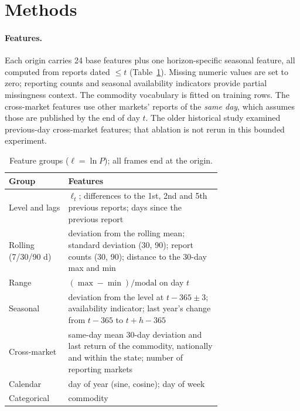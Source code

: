 \section{Methods}\label{sec:methods}

\paragraph{Features.}
Each origin carries 24 base features plus one horizon-specific seasonal feature, all computed from reports dated $\le t$ (Table~\ref{tab:features}).
Missing numeric values are set to zero; reporting counts and seasonal availability indicators provide partial missingness context. The commodity vocabulary is fitted on training rows.
The cross-market features use other markets' reports of the \emph{same day}, which assumes those are published by the end of day $t$.
The older historical study examined previous-day cross-market features; that ablation is not rerun in this bounded experiment.

\begin{table}[!t]\centering\small
\caption{Feature groups ($\ell=\ln P$); all frames end at the origin.}\label{tab:features}
\begin{tabular}{@{}lp{0.72\linewidth}@{}}\toprule
Group & Features\\\midrule
Level and lags & $\ell_t$; differences to the 1st, 2nd and 5th previous reports; days since the previous report\\
Rolling (7/30/90 d) & deviation from the rolling mean; standard deviation (30, 90); report counts (30, 90); distance to the 30-day max and min\\
Range & $(\max-\min)/\text{modal}$ on day $t$\\
Seasonal & deviation from the level at $t-365\pm3$; availability indicator; last year's change from $t-365$ to $t+h-365$\\
Cross-market & same-day mean 30-day deviation and last return of the commodity, nationally and within the state; number of reporting markets\\
Calendar & day of year (sine, cosine); day of week\\
Categorical & commodity\\\bottomrule
\end{tabular}\end{table}

